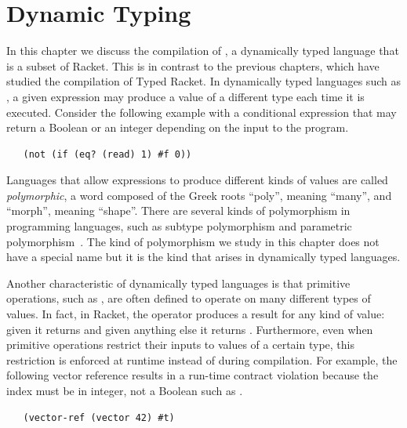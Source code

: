 \documentclass[11pt]{book}
\begin{document}
\chapter{Dynamic Typing}
\label{ch:Rdyn}

In this chapter we discuss the compilation of \LangDyn{}, a dynamically
typed language that is a subset of Racket. This is in contrast to the
previous chapters, which have studied the compilation of Typed
Racket. In dynamically typed languages such as \LangDyn{}, a given
expression may produce a value of a different type each time it is
executed. Consider the following example with a conditional 
expression that may return a Boolean or an integer depending on the
input to the program.
\begin{lstlisting}
   (not (if (eq? (read) 1) #f 0))
\end{lstlisting}
Languages that allow expressions to produce different kinds of values
are called \emph{polymorphic}, a word composed of the Greek roots
``poly'', meaning ``many'', and ``morph'', meaning ``shape''.  There
are several kinds of polymorphism in programming languages, such as
subtype polymorphism and parametric
polymorphism~\citep{Cardelli:1985kx}. The kind of polymorphism we
study in this chapter does not have a special name but it is the kind
that arises in dynamically typed languages.

Another characteristic of dynamically typed languages is that
primitive operations, such as , are often defined to operate
on many different types of values. In fact, in Racket, the 
operator produces a result for any kind of value: given  it
returns  and given anything else it returns .
Furthermore, even when primitive operations restrict their inputs to
values of a certain type, this restriction is enforced at runtime
instead of during compilation. For example, the following vector
reference results in a run-time contract violation because the index
must be in integer, not a Boolean such as .
\begin{lstlisting}
   (vector-ref (vector 42) #t)
\end{lstlisting}
\end{document}
